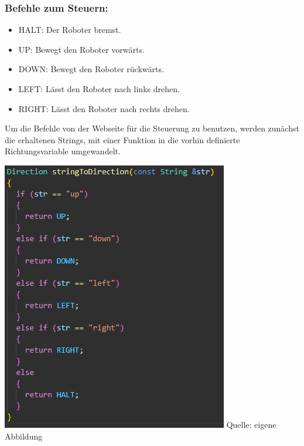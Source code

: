 \documentclass[ngerman,12pt,a4paper]{article}
\begin{document}
	\subsubsection*{Befehle zum Steuern:}
	\begin{itemize}
		\item HALT: Der Roboter bremst.
		\item UP: Bewegt den Roboter vorwärts.
		\item DOWN: Bewegt den Roboter rückwärts.
		\item LEFT: Lässt den Roboter nach links drehen.
		\item RIGHT: Lässt den Roboter nach rechts drehen.
	\end{itemize}\newpage
	\noindent
	Um die Befehle von der Webseite für die Steuerung zu benutzen, werden zunächst die erhaltenen Strings, mit einer Funktion in die vorhin definierte Richtungsvariable umgewandelt. \\[0.5cm]
	\begin{minipage}{\textwidth}
		\centering
		\includegraphics[scale=1.0]{Pictures/code_stringtoenum_motoren}
		\label{fig:code_stringtoenum_motoren}
		\vspace{-2pt}
		\small Quelle: eigene Abbildung
	\end{minipage}
\end{document}
